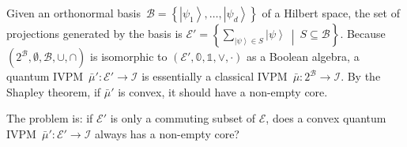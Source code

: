 \documentclass{article}
\theoremstyle{remark}
\newcommand{\events}{\ensuremath{\mathcal{E}}}
\newcommand{\ket}[1]{{\left\vert{#1}\right\rangle}}
\newcommand{\set}[2]{\ensuremath{\left\{ {#1}~\middle|~{#2}\right\} }}
\begin{document}
Given an orthonormal basis~$\mathcal{B}=\left\{ \ket{\psi_{1}},\ldots,\ket{\psi_{d}}\right\} $
of a Hilbert space, the set of projections generated by the basis
is $\events'=\set{\sum_{\ket{\psi}\in S}\ket{\psi}}{S\subseteq\mathcal{B}}$.
Because $\left(2^{\mathcal{B}},\emptyset,\mathcal{B},\cup,\cap\right)$
is isomorphic to $\left(\events',\mathbb{0},\mathbb{1},\vee,\cdot\right)$
as a Boolean algebra, a quantum IVPM~$\bar{\mu}':\events'\rightarrow\mathscr{I}$
is essentially a classical IVPM~$\bar{\mu}:2^{\mathcal{B}}\rightarrow\mathscr{I}$.
By the Shapley theorem, if $\bar{\mu}'$ is convex, it should have
a non-empty core. 

The problem is: if $\events'$ is only a commuting subset of $\events$,
does a convex quantum IVPM~$\bar{\mu}':\events'\rightarrow\mathscr{I}$
always has a non-empty core?
\end{document}
